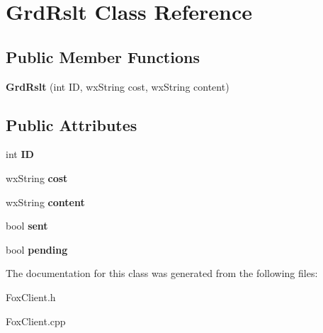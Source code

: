 \hypertarget{class_grd_rslt}{}\section{Grd\+Rslt Class Reference}
\label{class_grd_rslt}
\subsection*{Public Member Functions}
\begin{DoxyCompactItemize}
\item 
\mbox{\label{class_grd_rslt_ae199af4002a5870500126c22c03e3203}} 
{\bfseries Grd\+Rslt} (int ID, wx\+String cost, wx\+String content)
\end{DoxyCompactItemize}
\subsection*{Public Attributes}
\begin{DoxyCompactItemize}
\item 
\mbox{\label{class_grd_rslt_a5eb6ae12b097946572faee7945f228ec}} 
int {\bfseries ID}
\item 
\mbox{\label{class_grd_rslt_a7ce11f5d1383ef991f882b95db4565d7}} 
wx\+String {\bfseries cost}
\item 
\mbox{\label{class_grd_rslt_ab10c9f035cae5c72994b53b72b3201bd}} 
wx\+String {\bfseries content}
\item 
\mbox{\label{class_grd_rslt_aa67c1f801c03d7299c7166c965628230}} 
bool {\bfseries sent}
\item 
\mbox{\label{class_grd_rslt_a24f02343bb456732f31caec3427629d0}} 
bool {\bfseries pending}
\end{DoxyCompactItemize}


The documentation for this class was generated from the following files\+:\begin{DoxyCompactItemize}
\item 
Fox\+Client.\+h\item 
Fox\+Client.\+cpp\end{DoxyCompactItemize}
